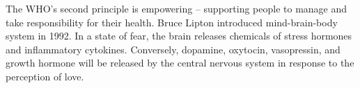 \documentclass[12pt, a4paper]{article}
\begin{document}
The WHO's second principle is empowering – supporting people to manage and take responsibility for their health.
Bruce Lipton introduced mind-brain-body system in 1992\cite{Mokhtari2011}\cite{Kobisi2012}\cite{Gustafson2017}.
In a state of fear, the brain releases chemicals of stress hormones and inflammatory cytokines.
Conversely, dopamine, oxytocin, vasopressin, and growth hormone will be released by the central nervous system in response to the perception of love.
\end{document}
